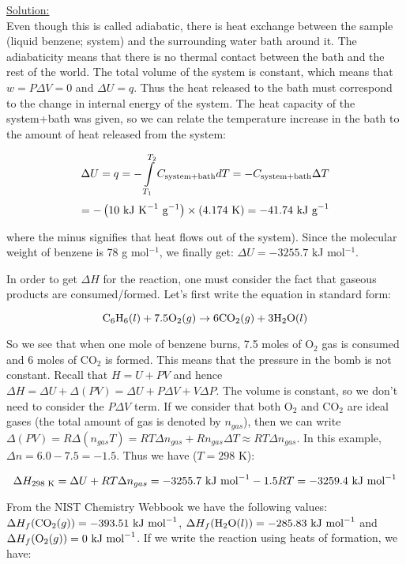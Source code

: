 \noindent
\underline{Solution:}\\

Even though this is called adiabatic, there is heat exchange between the sample (liquid benzene; system) and the surrounding water bath around it. The adiabaticity means that there is no thermal contact between the bath and the rest of the world. The total volume of the system is constant, which means that $w = P\Delta V = 0$ and $\Delta U = q$. Thus the heat released to the bath must correspond to the change in internal energy of the system. The heat capacity of the system+bath was given, so we can relate the temperature increase in
the bath to the amount of heat released from the system:

$$\Delta U = q = -\int\limits_{T_1}^{T_2}C_{\textnormal{system+bath}}dT = -C_{\textnormal{system+bath}}\Delta T$$
$$ = -\left(10\textnormal{ kJ K}^{-1}\textnormal{ g}^{-1}\right)\times\left(4.174\textnormal{ K}\right) = -41.74\textnormal{ kJ g}^{-1}$$

where the minus signifies that heat flows out of the system). Since the molecular weight of benzene is 78 g mol$^{-1}$, we finally get: $\Delta U = -3255.7$ kJ mol$^{-1}$.

In order to get $\Delta H$ for the reaction, one must consider the fact that gaseous products are consumed/formed. Let's first write the equation in standard form:

$$\textnormal{C}_6\textnormal{H}_6(l) + 7.5\textnormal{O}_2(g) \rightarrow 6\textnormal{CO}_2(g) + 3\textnormal{H}_2\textnormal{O}(l)$$

So we see that when one mole of benzene burns, 7.5 moles of O$_2$ gas is consumed and 6 moles of CO$_2$ is formed. This means that the pressure in the bomb is not constant. Recall that $H = U + PV$ and hence $\Delta H = \Delta U + \Delta (PV) = \Delta U + P\Delta V + V\Delta P$. The volume is constant, so we don't need to consider the $P\Delta V$ term. If we consider that both O$_2$ and CO$_2$ are ideal gases (the total amount of gas is denoted by $n_{gas}$), then we can write $\Delta (PV) = R\Delta (n_{gas}T) = RT\Delta n_{gas} + Rn_{gas}\Delta T \approx RT\Delta n_{gas}$. In this example, $\Delta n = 6.0 - 7.5 = -1.5$. Thus we have ($T = 298$ K):

$$\Delta H_{298\textnormal{ K}} = \Delta U + RT\Delta n_{gas} = -3255.7\textnormal{ kJ mol}^{-1} - 1.5RT = -3259.4\textnormal{ kJ mol}^{-1}$$

From the NIST Chemistry Webbook we have the following values: $\Delta H_f(\textnormal{CO}_2(g)) = -393.51\textnormal{ kJ mol}^{-1}$, $\Delta H_f(\textnormal{H}_2\textnormal{O}(l)) = -285.83\textnormal{ kJ mol}^{-1}$ and $\Delta H_f(\textnormal{O}_2(g)) = 0\textnormal{ kJ mol}^{-1}$. If we write the reaction using heats of formation, we have:

